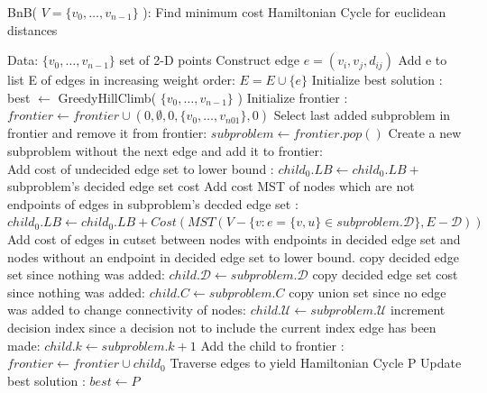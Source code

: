 \documentclass[format=sigconf]{acmart}
\begin{document}
 \newpage
\begin{algorithm}[htbp] 
	\caption{  BnB( $V = \{v_0, \hdots, v_{n-1}\}$ ): Find minimum cost Hamiltonian Cycle for euclidean distances}
	\begin{algorithmic} 
		\STATE Data: $\{v_0, \hdots, v_{n-1}\}$ set of 2-D points
			\STATE Construct edge $e = (v_i, v_j, d_{ij})$
			\STATE Add e to list E of edges in increasing weight order: $E = E \cup \{e\}$
		\ENDFOR
		\STATE Initialize best solution : best $\leftarrow$ GreedyHillClimb( $\{v_0, \hdots, v_{n-1}\}$ )
		\STATE Initialize frontier : $frontier  \leftarrow frontier \cup (0, \emptyset, 0, \{ v_0, \hdots, v_{n01} \}, 0)$
			\STATE Select last added subproblem in frontier and remove it from frontier: $subproblem \leftarrow frontier.pop()$ \vspace{4pt}
			\STATE Create a new subproblem without the next edge and add it to frontier:\\
			\STATE Add cost of undecided edge set to lower bound : $child_0.LB \leftarrow child_0.LB + $ subproblem's decided edge set cost
			\STATE Add cost MST of nodes which are not endpoints of edges in subproblem's decded edge set : \\
			 $child_0.LB \leftarrow child_0.LB + Cost( MST( V - \{ v : e = \{ v,u \} \in subproblem.\mathcal{D} \}, E-\mathcal{D} ) )$ 
			\STATE Add cost of edges in cutset between nodes with endpoints in decided edge set and nodes without an endpoint in decided edge set to lower bound.
			\STATE copy decided edge set since nothing was added: $child.\mathcal{D} \leftarrow subproblem.\mathcal{D}$
			\STATE copy decided edge set cost since nothing was added: $child.C \leftarrow subproblem.C$ 
			\STATE copy union set since no edge was added to change connectivity of nodes: $child.\mathcal{U} \leftarrow subproblem.\mathcal{U}$ 
			\STATE increment decision index since a decision not to include the current index edge has been made: $child.k \leftarrow subproblem.k+1$
			\STATE Add the child to frontier : $frontier \leftarrow frontier \cup child_0$
			\vspace{4pt}
						\STATE Traverse edges to yield Hamiltonian Cycle P
							\STATE Update best solution : $best \leftarrow P$

\end{algorithmic}
\end{algorithm}
\end{document}
